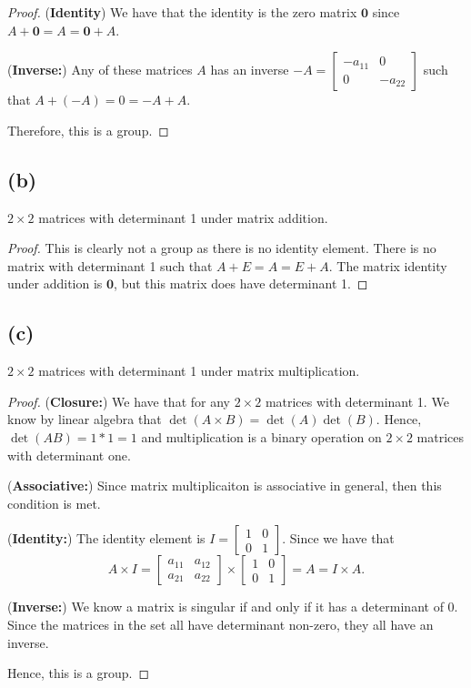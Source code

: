 \documentclass{article}
\begin{document}
\begin{proof}
    (\textbf{Identity}) We have that the identity is the zero matrix $\bm{0}$ since
    $A + \bm{0} = A = \bm{0} + A$.

    (\textbf{Inverse:}) Any of these matrices $A$ has an inverse $-A = \begin{bmatrix}
            -a_{11} & 0       \\
            0       & -a_{22}
        \end{bmatrix}$ such that $A + (-A) = 0 = -A + A$.

    Therefore, this is a group.
\end{proof}

\subsection*{(b)}
$2\times 2$ matrices with determinant 1 under matrix addition.

\begin{proof}
    This is clearly not a group as there is no identity element. There is no matrix with
    determinant 1 such that $A + E = A = E + A$. The matrix identity under addition
    is $\bm{0}$, but this matrix does have determinant 1.
\end{proof}

\subsection*{(c)}
$2\times 2$ matrices with determinant 1 under matrix multiplication.

\begin{proof}
    (\textbf{Closure:})
    We have that for any $2\times 2$ matrices with determinant 1. We know by linear
    algebra that $\det(A\times B) = \det(A)\det(B)$. Hence, $\det(AB) = 1*1 = 1$
    and multiplication is a binary operation on $2\times 2$ matrices with determinant
    one.

    (\textbf{Associative:}) Since matrix multiplicaiton is associative in general, then this
    condition is met.

    (\textbf{Identity:}) The identity element is $I = \begin{bmatrix}
            1 & 0 \\
            0 & 1
        \end{bmatrix}.$ Since we have that
    \begin{equation}
        A\times I = \begin{bmatrix}
            a_{11} & a_{12} \\
            a_{21} & a_{22}
        \end{bmatrix} \times \begin{bmatrix}
            1 & 0 \\
            0 & 1
        \end{bmatrix} = A = I\times A.
    \end{equation}

    (\textbf{Inverse:}) We know a matrix is singular if and only if it has a determinant of 0.
    Since the matrices in the set all have determinant non-zero, they all have an inverse.

    Hence, this is a group.
\end{proof}
\end{document}
